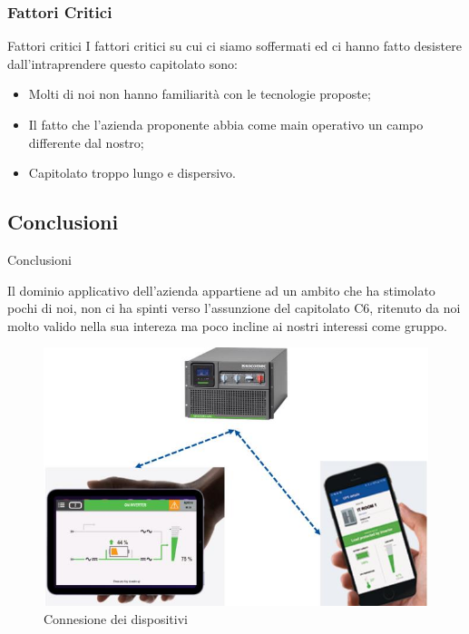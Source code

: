 \documentclass[11pt]{article}
\begin{document}
    \subsubsection{Fattori Critici} Fattori critici
    I fattori critici su cui ci siamo soffermati ed ci hanno fatto desistere dall'intraprendere questo capitolato sono:
    \begin{itemize}
            \item Molti di noi non hanno familiarità con le tecnologie proposte;
            \item Il fatto che l'azienda proponente abbia come main operativo un campo differente dal nostro; 
            \item Capitolato troppo lungo e dispersivo.
        \end{itemize}
    \subsection{Conclusioni} Conclusioni
    
    Il dominio applicativo dell'azienda appartiene ad un ambito che ha stimolato pochi di noi, non ci ha spinti verso l'assunzione del capitolato C6, ritenuto da noi molto valido nella sua intereza ma poco incline ai nostri interessi come gruppo.
    
    \begin{figure}[h!]
        \centering
        \includegraphics[scale=0.4]{Res/SocomecConnection.png}
        \caption{Connesione dei dispositivi}
        \label{socom}
    \end{figure}
\end{document}
